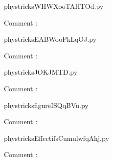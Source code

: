 
    \newcommand{\CaptionFigWHWXooTAHTOd}{<+Type your caption here+>}
    \begin{center}
        
    \end{center}
    phystricksWHWXooTAHTOd.py

    Comment : 

    \clearpage
    


    \newcommand{\CaptionFigEABWooPkLqOJ}{<+Type your caption here+>}
    \begin{center}
        
    \end{center}
    phystricksEABWooPkLqOJ.py

    Comment : 

    \clearpage
    


    \newcommand{\CaptionFigJOKJMTD}{<+Type your caption here+>}
    \begin{center}
        
    \end{center}
    phystricksJOKJMTD.py

    Comment : 

    \clearpage
    


    \newcommand{\CaptionFigfigureISQqBVu}{<+Type your caption here+>}
    \begin{center}
        
    \end{center}
    phystricksfigureISQqBVu.py

    Comment : 

    \clearpage
    


    \newcommand{\CaptionFigEffectifsCumulwfqAhj}{<+Type your caption here+>}
    \begin{center}
        
    \end{center}
    phystricksEffectifsCumulwfqAhj.py

    Comment : 

    \clearpage
    



